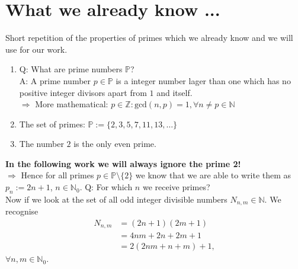 \section{What we already know ...}
\label{s:whatwealreadyknow}
Short repetition of the properties of primes which we already know and we will use for our work.
\begin{enumerate}
	\item Q: What are prime numbers $\mathbb{P}$? \\
		A: A prime number $p \in \mathbb{P}$ is a integer number lager than one which has no positive integer divisors apart from $1$ and itself. \\
		$\Rightarrow$ More mathematical: $p \in \mathbb{Z}:\mathrm{gcd}\left(n,p\right) = 1, \forall n \neq p \in \mathbb{N}$
	\item The set of primes: $\mathbb{P} := \{ 2, 3, 5, 7, 11, 13, \dots\}$
	\item The number $2$ is the only even prime.
\label{en:propertiesprimes}\end{enumerate}

\textbf{In the following work we will always ignore the prime 2!} \\

$\Rightarrow$ Hence for all primes $p \in \mathbb{P} \setminus \{2\}$ we know that we are able to write them as $p_{n} := 2n + 1$, $n \in \mathbb{N}_{0}$. Q: For which $n$ we receive primes? \\

Now if we look at the set of all odd integer divisible numbers $N_{n,m} \in \mathbb{N}$. We recognise
\begin{equation}\begin{split}
	N_{n,m} & = \left(2n + 1\right)\left(2m + 1\right) \\
	& = 4nm + 2n + 2m + 1 \\
	& = 2\left(2nm + n + m\right) + 1,
\end{split}\label{eq:intdivnumbN}\end{equation} 
$\forall n,m \in \mathbb{N}_{0}$.





\nocite{*}
\newpage
%



